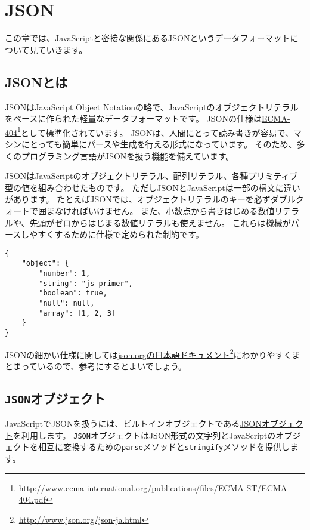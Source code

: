 \hypertarget{json}{%
\chapter{JSON}\label{json}}
\thispagestyle{frontheadings}

この章では、JavaScriptと密接な関係にあるJSONというデータフォーマットについて見ていきます。

\hypertarget{what-is-json}{%
\section{JSONとは}\label{what-is-json}}

JSONはJavaScript Object
Notationの略で、JavaScriptのオブジェクトリテラルをベースに作られた軽量なデータフォーマットです。
JSONの仕様は\href{http://www.ecma-international.org/publications/files/ECMA-ST/ECMA-404.pdf}{ECMA-404}\footnote{\url{http://www.ecma-international.org/publications/files/ECMA-ST/ECMA-404.pdf}}として標準化されています。
JSONは、人間にとって読み書きが容易で、マシンにとっても簡単にパースや生成を行える形式になっています。
そのため、多くのプログラミング言語がJSONを扱う機能を備えています。

JSONはJavaScriptのオブジェクトリテラル、配列リテラル、各種プリミティブ型の値を組み合わせたものです。
ただしJSONとJavaScriptは一部の構文に違いがあります。
たとえばJSONでは、オブジェクトリテラルのキーを必ずダブルクォートで囲まなければいけません。
また、小数点から書きはじめる数値リテラルや、先頭がゼロからはじまる数値リテラルも使えません。
これらは機械がパースしやすくするために仕様で定められた制約です。

\begin{lstlisting}
{
    "object": { 
        "number": 1, 
        "string": "js-primer",
        "boolean": true,
        "null": null,
        "array": [1, 2, 3]
    }
}
\end{lstlisting}

JSONの細かい仕様に関しては\href{http://www.json.org/json-ja.html}{json.orgの日本語ドキュメント}\footnote{\url{http://www.json.org/json-ja.html}}にわかりやすくまとまっているので、参考にするとよいでしょう。

\hypertarget{json-object}{%
\section{\texorpdfstring{\texttt{JSON}オブジェクト}{JSONオブジェクト}}\label{json-object}}

JavaScriptでJSONを扱うには、ビルトインオブジェクトである\href{https://developer.mozilla.org/ja/docs/Web/JavaScript/Reference/Global_Objects/JSON}{JSONオブジェクト}を利用します。
\texttt{JSON}オブジェクトはJSON形式の文字列とJavaScriptのオブジェクトを相互に変換するための\texttt{parse}メソッドと\texttt{stringify}メソッドを提供します。

